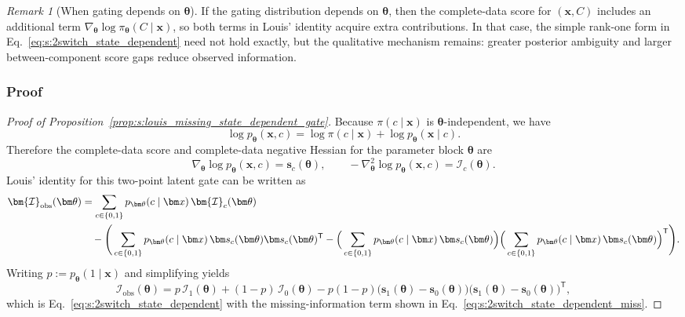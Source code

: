 \documentclass[twoside]{article}
\theoremstyle{plain}
\theoremstyle{definition}
\theoremstyle{remark}
\newtheorem{remark}{Remark}
\newcommand{\Io}{\bm{\mathcal{I}}_{\mathrm{obs}}}
\begin{document}
\begin{remark}[When gating depends on $\bm\theta$]
If the gating distribution depends on $\bm\theta$, then the complete-data score for $(\bm x, C)$ includes an additional term
$\nabla_{\bm\theta}\log \pi_{\bm\theta}(C\mid \bm{x})$, so both terms in Louis’ identity acquire extra contributions.
In that case, the simple rank-one form in Eq.~\eqref{eq:s:2switch_state_dependent} need not hold exactly, but the qualitative mechanism remains:
greater posterior ambiguity and larger between-component score gaps reduce observed information.
\end{remark}

\subsubsection{Proof}
\begin{proof}[Proof of Proposition~\ref{prop:s:louis_missing_state_dependent_gate}]
Because $\pi(c\mid \bm x)$ is $\bm\theta$-independent, we have
\begin{equation}
\log p_{\bm\theta}(\bm x,c)=\log \pi(c\mid \bm x)+\log p_{\bm\theta}(\bm x\mid c).
\end{equation}
Therefore the complete-data score and complete-data negative Hessian for the parameter block $\bm\theta$ are
\begin{equation}
\nabla_{\bm\theta}\log p_{\bm\theta}(\bm x,c)=\bm s_c(\bm\theta),
\qquad
-\nabla_{\bm\theta}^2\log p_{\bm\theta}(\bm x,c)=\bm{\mathcal I}_c(\bm\theta).
\end{equation}
Louis' identity for this two-point latent gate can be written as
\begin{align}
\Io(\bm\theta)
&=\sum_{c\in\{0,1\}}p_{\bm\theta}(c\mid \bm x)\,\bm{\mathcal I}_c(\bm\theta)\notag\\
&\quad-\Bigg(
\sum_{c\in\{0,1\}}p_{\bm\theta}(c\mid \bm x)\,\bm s_c(\bm\theta)\bm s_c(\bm\theta)^{\mathsf T}
-\Big(\sum_{c\in\{0,1\}}p_{\bm\theta}(c\mid \bm x)\,\bm s_c(\bm\theta)\Big)\Big(\sum_{c\in\{0,1\}}p_{\bm\theta}(c\mid \bm x)\,\bm s_c(\bm\theta)\Big)^{\mathsf T}
\Bigg).
\end{align}
Writing $p:=p_{\bm\theta}(1\mid \bm x)$ and simplifying yields
\begin{equation}
\Io(\bm\theta)=p\,\bm{\mathcal I}_1(\bm\theta)+(1-p)\,\bm{\mathcal I}_0(\bm\theta)
-p(1-p)\big(\bm s_1(\bm\theta)-\bm s_0(\bm\theta)\big)\big(\bm s_1(\bm\theta)-\bm s_0(\bm\theta)\big)^{\mathsf T},
\end{equation}
which is Eq.~\eqref{eq:s:2switch_state_dependent} with the missing-information term shown in Eq.~\eqref{eq:s:2switch_state_dependent_miss}.
\end{proof}
\end{document}
